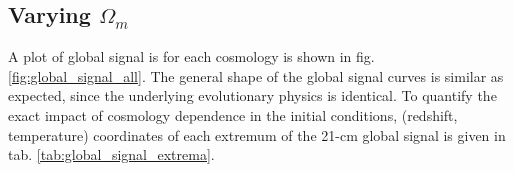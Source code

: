 \documentclass[floats,floatfix,showpacs,amssymb,prd,superscriptaddress,nofootinbib]{revtex4-2} %
\begin{document}
\subsection{Varying $\Omega_m$}

A plot of global signal is for each cosmology is shown in fig. \ref{fig:global_signal_all}. The general shape of the global signal curves is similar as expected, since the underlying evolutionary physics is identical. To quantify the exact impact of cosmology dependence in the initial conditions, (redshift, temperature) coordinates of each extremum of the 21-cm global signal is given in tab. \ref{tab:global_signal_extrema}.


\end{document}
